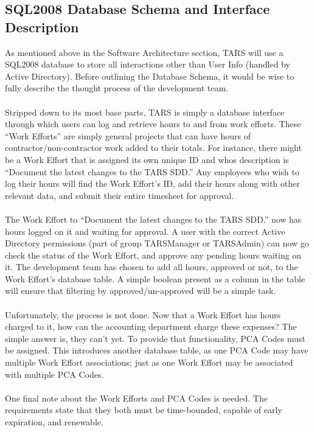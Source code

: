 \documentclass[letterpaper]{article}
\begin{document}
\subsection{SQL2008 Database Schema and Interface Description}
As mentioned above in the Software Architecture section, TARS will use a SQL2008 database to store all interactions other than User Info (handled by Active Directory). Before outlining the Database Schema, it would be wise to fully describe the thought process of the development team.\\
\\
Stripped down to its most base parts, TARS is simply a database interface through which users can log and retrieve hours to and from work efforts. These ``Work Efforts'' are simply general projects that can have hours of contractor/non-contractor work added to their totals. For instance, there might be a Work Effort that is assigned its own unique ID and whos description is ``Document the latest changes to the TARS SDD.'' Any employees who wish to log their hours will find the Work Effort's ID, add their hours along with other relevant data, and submit their entire timesheet for approval. \\
\\
The Work Effort to ``Document the latest changes to the TARS SDD.'' now has hours logged on it and waiting for approval. A user with the correct Active Directory permissions (part of group TARSManager or TARSAdmin) can now go check the status of the Work Effort, and approve any pending hours waiting on it. The development team has chosen to add all hours, approved or not, to the Work Effort's database table. A simple boolean present as a column in the table will ensure that filtering by approved/un-approved will be a simple task.\\
\\
Unfortunately, the process is not done. Now that a Work Effort has hours charged to it, how can the accounting department charge these expenses? The simple answer is, they can't yet. To provide that functionality, PCA Codes must be assigned. This introduces another database table, as one PCA Code may have multiple Work Effort associations; just as one Work Effort may be associated with multiple PCA Codes.\\
\\
One final note about the Work Efforts and PCA Codes is needed. The requirements state that they both must be time-bounded, capable of early expiration, and renewable. \\
\end{document}
